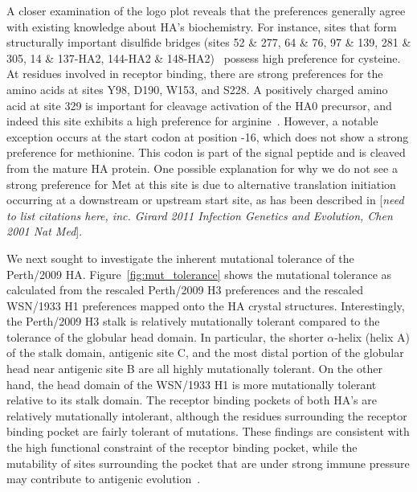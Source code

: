 \documentclass[11pt]{article}
\newcommand{\comment}[1]{{\color{red}[\textsl{#1}]}}
\begin{document}
A closer examination of the logo plot reveals that the preferences generally agree with existing knowledge about HA's biochemistry.
For instance, sites that form structurally important disulfide bridges (sites 52 \& 277, 64 \& 76, 97 \& 139, 281 \& 305, 14 \& 137-HA2, 144-HA2 \& 148-HA2)~\citep{waterfield1981disulphide} possess high preference for cysteine.
At residues involved in receptor binding, there are strong preferences for the amino acids at sites Y98, D190, W153, and S228.
A positively charged amino acid at site 329 is important for cleavage activation of the HA0 precursor, and indeed this site exhibits a high preference for arginine~\citep{kido1992isolation, stech2005new}.
However, a notable exception occurs at the start codon at position -16, which does not show a strong preference for methionine. 
This codon is part of the signal peptide and is cleaved from the mature HA protein.
One possible explanation for why we do not see a strong preference for Met at this site is due to alternative translation initiation occurring at a downstream or upstream start site, as has been described in \comment{need to list citations here, inc. Girard 2011 Infection Genetics and Evolution, Chen 2001 Nat Med}.

We next sought to investigate the inherent mutational tolerance of the Perth/2009 HA. 
Figure~\ref{fig:mut_tolerance} shows the mutational tolerance as calculated from the rescaled Perth/2009 H3 preferences and the rescaled WSN/1933 H1 preferences mapped onto the HA crystal structures.
Interestingly, the Perth/2009 H3 stalk is relatively mutationally tolerant compared to the tolerance of the globular head domain. 
In particular, the shorter $\alpha$-helix (helix A) of the stalk domain, antigenic site C, and the most distal portion of the globular head near antigenic site B are all highly mutationally tolerant.
On the other hand, the head domain of the WSN/1933 H1 is more mutationally tolerant relative to its stalk domain.
The receptor binding pockets of both HA's are relatively mutationally intolerant, although the residues surrounding the receptor binding pocket are fairly tolerant of mutations.
These findings are consistent with the high functional constraint of the receptor binding pocket, while the mutability of sites surrounding the pocket that are under strong immune pressure may contribute to antigenic evolution~\citep{wilson1981structure, wiley1981structural}.
\end{document}
